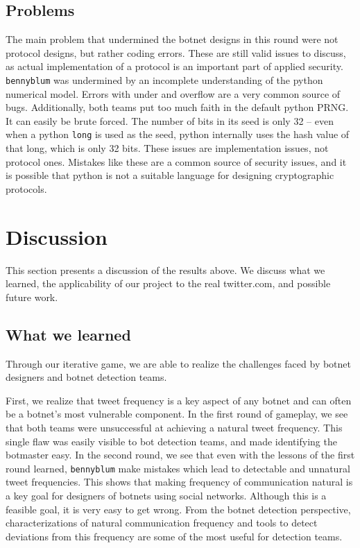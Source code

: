 \documentclass[11pt, oneside]{article} %
\numberwithin{equation}{section} %
\numberwithin{figure}{section} %
\numberwithin{table}{section} %
\renewcommand{\c}[1]{\texttt{#1}}
\newcommand{\code}[1]{\c{#1}}
\newcommand{\teambb}{\c{bennyblum}}
\begin{document}
	\subsection{Problems}
		The main problem that undermined the botnet designs in this round were not protocol designs, but rather coding errors.
		These are still valid issues to discuss, as actual implementation of a protocol is an important part of applied security.
		\teambb{} was undermined by an incomplete understanding of the python numerical model. Errors with under and overflow
		are a very common source of bugs. Additionally, both teams put too much faith in the default python PRNG. It can easily
		be brute forced. The number of bits in its seed is only 32 -- even when a python \code{long} is used as the seed, python
		internally uses the hash value of that long, which is only 32 bits. These issues are implementation issues, not protocol
		ones. Mistakes like these are a common source of security issues, and it is possible that python is not a suitable language
		for designing cryptographic protocols.

\section{Discussion}
	This section presents a discussion of the results above. We discuss what we learned, the applicability of our project
	to the real twitter.com, and possible future work.

	\subsection{What we learned}
		Through our iterative game, we are able to realize the challenges faced by botnet designers and botnet detection teams. 

		First, we realize that tweet frequency is a key aspect of any botnet and can often be a botnet's most vulnerable component. In the first round of gameplay, we see that both teams were unsuccessful at achieving a natural tweet frequency. This single flaw was easily visible to bot detection teams, and made identifying the botmaster easy. In the second round, we see that even with the lessons of the first round learned, \teambb{} make mistakes which lead to detectable and unnatural tweet frequencies. This shows that making frequency of communication natural is a key goal for designers of botnets using social networks. Although this is a feasible goal, it is very easy to get wrong. From the botnet detection perspective, characterizations of natural communication frequency and tools to detect deviations from this frequency are some of the most useful for detection teams. 
\end{document}
